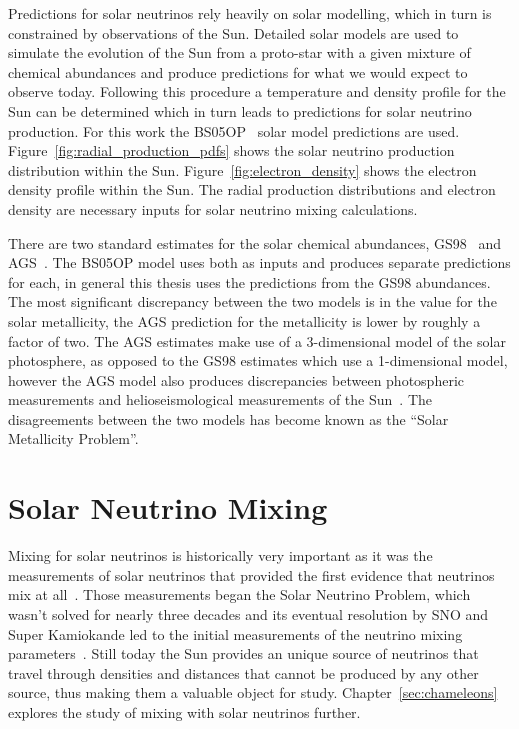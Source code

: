 Predictions for solar neutrinos rely heavily on solar modelling, which in turn
is constrained by observations of the Sun.
Detailed solar models are used to simulate the evolution of the Sun from a proto-star
with a given mixture of chemical abundances and produce predictions for
what we would expect to observe today.
Following this procedure a temperature and density profile for the Sun can be determined
which in turn leads to predictions for solar neutrino production.
For this work the BS05OP~\citep{bs_ssm} solar model predictions are used.
Figure~\ref{fig:radial_production_pdfs} shows the solar neutrino production
distribution within the Sun.
Figure~\ref{fig:electron_density} shows the electron density profile within
the Sun.
The radial production distributions and electron density are necessary inputs
for solar neutrino mixing calculations.

There are two standard estimates for the solar chemical abundances,
GS98~\citep{gs98} and AGS~\citep{ags}.
The BS05OP model uses both as inputs and produces separate predictions for each,
in general this thesis uses the predictions from the GS98 abundances.
The most significant discrepancy between the two models is in the value
for the solar metallicity, the AGS prediction for the metallicity is
lower by roughly a factor of two.
The AGS estimates make use of a 3-dimensional model of the solar photosphere,
as opposed to the GS98 estimates which use a 1-dimensional model, however
the AGS model also produces discrepancies between photospheric measurements
and helioseismological measurements of the Sun~\citep{ags, bahcall01}.
The disagreements between the two models has become known as the
``Solar Metallicity Problem''.

\section{Solar Neutrino Mixing}
\label{sec:solar_nu_mixing}
Mixing for solar neutrinos is historically very important as it was
the measurements of solar neutrinos that provided the first evidence that
neutrinos mix at all~\citep{homestake,solar_nu_problem}.
Those measurements began the Solar Neutrino Problem, which wasn't solved
for nearly three decades and its eventual resolution by SNO and Super Kamiokande
led to the initial measurements of the neutrino mixing parameters~\citep{superk_atmospherics,
sno_second}.
Still today the Sun provides an unique source of neutrinos that travel through
densities and distances that cannot be produced by any other source, thus making
them a valuable object for study.
Chapter~\ref{sec:chameleons} explores the study of mixing with
solar neutrinos further.

